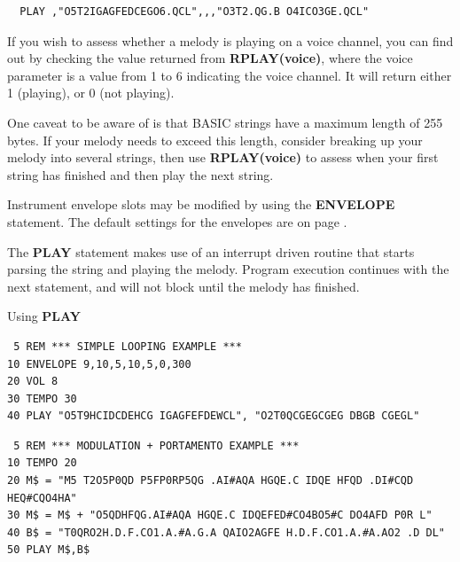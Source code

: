\begin{description}[leftmargin=2cm,style=nextline]
\begin{tcolorbox}[colback=black,coltext=white]
\verbatimfont{\codefont}
\begin{verbatim}
  PLAY ,"O5T2IGAGFEDCEGO6.QCL",,,"O3T2.QG.B O4ICO3GE.QCL"
\end{verbatim}
\end{tcolorbox}

  If you wish to assess whether a melody is playing on a voice channel, you can
  find out by checking the value returned from {\bf RPLAY(voice)}, where the voice parameter
  is a value from 1 to 6 indicating the voice channel. It will return either 1 (playing),
  or 0 (not playing).

  One caveat to be aware of is that BASIC strings have a maximum length of 255 bytes.
  If your melody needs to exceed this length, consider breaking up your melody into several
  strings, then use {\bf RPLAY(voice)} to assess when your first string has finished and then
  play the next string.

  Instrument envelope slots may be modified by using the {\bf ENVELOPE}
  statement. The default settings for the envelopes are on
page \pageref{envelopetable}.

\item [Remarks:] The {\bf PLAY} statement makes use of an interrupt
                 driven routine that starts parsing the string
                 and playing the melody. Program execution continues
                 with the next statement, and will not block until
                 the melody has finished.


\item [Example:] Using {\bf PLAY}
\begin{tcolorbox}[colback=black,coltext=white]
\verbatimfont{\codefont}
\begin{verbatim}
 5 REM *** SIMPLE LOOPING EXAMPLE ***
10 ENVELOPE 9,10,5,10,5,0,300
20 VOL 8
30 TEMPO 30
40 PLAY "O5T9HCIDCDEHCG IGAGFEFDEWCL", "O2T0QCGEGCGEG DBGB CGEGL"
\end{verbatim}
\end{tcolorbox}

\begin{tcolorbox}[colback=black,coltext=white]
\verbatimfont{\codefont}
\begin{verbatim}
 5 REM *** MODULATION + PORTAMENTO EXAMPLE ***
10 TEMPO 20
20 M$ = "M5 T2O5P0QD P5FP0RP5QG .AI#AQA HGQE.C IDQE HFQD .DI#CQD HEQ#CQO4HA"
30 M$ = M$ + "O5QDHFQG.AI#AQA HGQE.C IDQEFED#CO4BO5#C DO4AFD P0R L"
40 B$ = "T0QRO2H.D.F.CO1.A.#A.G.A QAIO2AGFE H.D.F.CO1.A.#A.AO2 .D DL"
50 PLAY M$,B$
\end{verbatim}
\end{tcolorbox}
\end{description}


